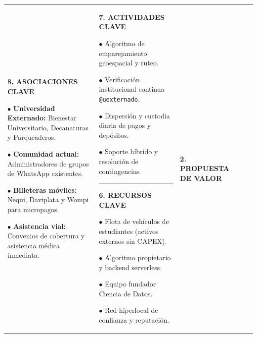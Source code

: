 \documentclass[11pt,a4paper]{article}
\begin{document}
\begin{table}[h!]
\centering
\scriptsize
\setlength{\tabcolsep}{3.5pt}
\renewcommand{\arraystretch}{1.25}
\begin{tabularx}{\textwidth}{|*{5}{>{\raggedright\arraybackslash}X|}}
\hline
\textbf{\color{primary}8. ASOCIACIONES CLAVE}\par\vspace{3pt}
$\bullet$ \textbf{Universidad Externado:} Bienestar Universitario, Decanaturas y Parqueaderos.\par\vspace{2pt}
$\bullet$ \textbf{Comunidad actual:} Administradores de grupos de WhatsApp existentes.\par\vspace{2pt}
$\bullet$ \textbf{Billeteras m\'oviles:} Nequi, Daviplata y Wompi para micropagos.\par\vspace{2pt}
$\bullet$ \textbf{Asistencia vial:} Convenios de cobertura y asistencia m\'edica inmediata. &
\textbf{\color{primary}7. ACTIVIDADES CLAVE}\par\vspace{3pt}
$\bullet$ Algoritmo de emparejamiento geoespacial y ruteo.\par\vspace{2pt}
$\bullet$ Verificaci\'on institucional continua \texttt{@uexternado}.\par\vspace{2pt}
$\bullet$ Dispersi\'on y custodia diaria de pagos y dep\'ositos.\par\vspace{2pt}
$\bullet$ Soporte h\'ibrido y resoluci\'on de contingencias.\par
\vspace{5pt}\hrule\vspace{5pt}
\textbf{\color{primary}6. RECURSOS CLAVE}\par\vspace{3pt}
$\bullet$ Flota de veh\'iculos de estudiantes (activos externos sin CAPEX).\par\vspace{2pt}
$\bullet$ Algoritmo propietario y backend serverless.\par\vspace{2pt}
$\bullet$ Equipo fundador Ciencia de Datos.\par\vspace{2pt}
$\bullet$ Red hiperlocal de confianza y reputaci\'on. &
\textbf{\color{primary}2. PROPUESTA DE VALOR}\par\vspace{3pt}

\end{tabularx}
\end{table}
\end{document}
